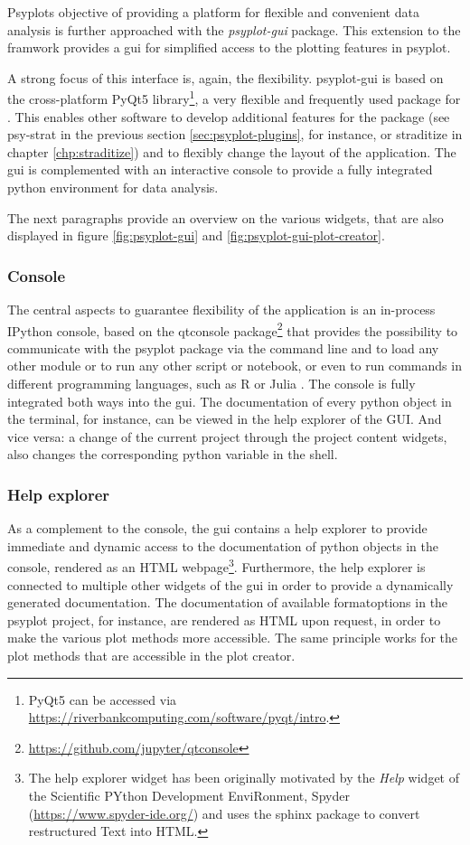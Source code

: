 \begin{refsection}
Psyplots objective of providing a platform for flexible and convenient data analysis is further approached with the \textit{psyplot-gui} package. This extension to the framwork provides a \gls{gui} for simplified access to the plotting features in psyplot.

A strong focus of this interface is, again, the flexibility. psyplot-gui is based on the cross-platform PyQt5 library\footnote{PyQt5 can be accessed via \url{https://riverbankcomputing.com/software/pyqt/intro}.}, a very flexible and frequently used package for . This enables other software to develop additional features for the package (see psy-strat in the previous section \ref{sec:psyplot-plugins}, for instance, or straditize in chapter \ref{chp:straditize}) and to flexibly change the layout of the application. The \gls{gui} is complemented with an interactive console to provide a fully integrated python environment for data analysis.

The next paragraphs provide an overview on the various widgets, that are also displayed in figure \ref{fig:psyplot-gui} and \ref{fig:psyplot-gui-plot-creator}. 

\subsubsection{Console}
The central aspects to guarantee flexibility of the application is an in-process IPython console, based on the qtconsole package\footnote{\url{https://github.com/jupyter/qtconsole}} that provides the possibility to communicate with the psyplot package via the command line and to load any other module or to run any other script or notebook, or even to run commands in different programming languages, such as R \citep{RCT2019} or Julia \citep{BezansonEdelmanKarpinskiEtAl2017}. The console is fully integrated both ways into the \gls{gui}. The documentation of every python object in the terminal, for instance, can be viewed in the help explorer of the GUI. And vice versa: a change of the current project through the project content widgets, also changes the corresponding python variable in the shell. 

\subsubsection{Help explorer}
As a complement to the console, the \gls{gui} contains a help explorer to provide immediate and dynamic access to the documentation of python objects in the console, rendered as an HTML webpage\footnote{The help explorer widget has been originally motivated by the \textit{Help} widget of the Scientific PYthon Development EnviRonment, Spyder (\url{https://www.spyder-ide.org/}) and uses the sphinx package \citep{Hasecke2019} to convert restructured Text into HTML.}. Furthermore, the help explorer is connected to multiple other widgets of the \gls{gui} in order to provide a dynamically generated documentation. The documentation of available formatoptions in the psyplot project, for instance, are rendered as HTML upon request, in order to make the various plot methods more accessible. The same principle works for the plot methods that are accessible in the plot creator.


\end{refsection}
